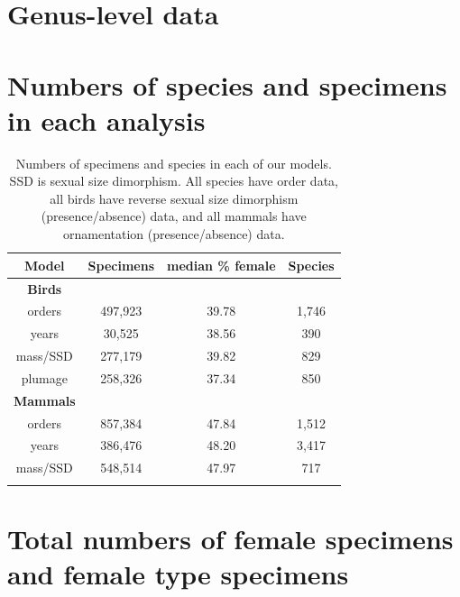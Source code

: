 \documentclass[a4paper, 12pt]{article}
\begin{document}
\newpage
\section{Genus-level data}



\newpage
\section{Numbers of species and specimens in each analysis}

\begin{table}[H]
\begin{tabular}{cccc}

  \hline
  \textbf{Model} & \textbf{Specimens} & \textbf{median \% female} & \textbf{Species}\\ 
  \hline
  \textbf{Birds} & & &\\
  \hline
  orders & 497,923 & 39.78 & 1,746\\
  years & 30,525 & 38.56 & 390\\
  mass/SSD & 277,179 & 39.82 & 829\\
  plumage & 258,326 & 37.34 & 850\\
  \hline
  \textbf{Mammals} &&&\\
  \hline
  orders & 857,384 & 47.84 & 1,512\\
  years & 386,476 & 48.20 & 3,417\\
  mass/SSD & 548,514 & 47.97 & 717\\
  \hline

\label{table_numbers}
\end{tabular}
\caption{Numbers of specimens and species in each of our models. SSD is sexual size dimorphism. All species have order data, all birds have reverse sexual size dimorphism (presence/absence) data, and all mammals have ornamentation (presence/absence) data.} 

\end{table}

\newpage
\section{Total numbers of female specimens and female type specimens}
\end{document}
